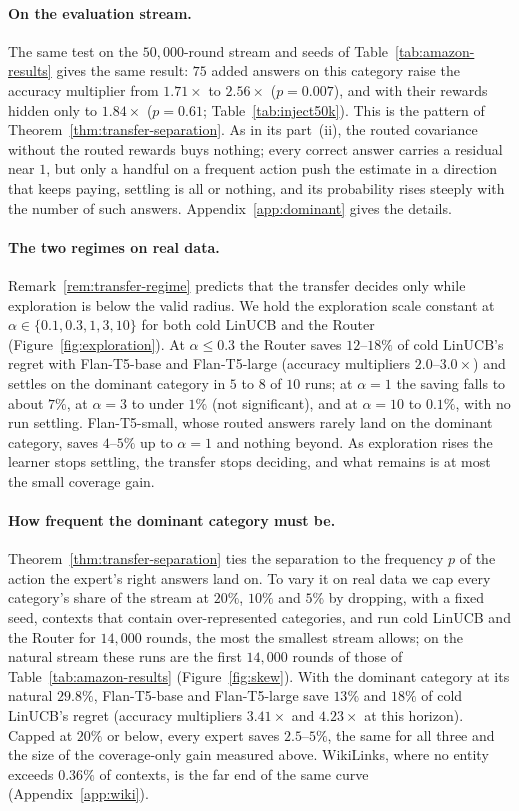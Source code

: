 \documentclass[anon]{alt2027} %
\begin{document}
\paragraph{On the evaluation stream.} The same test on the $50{,}000$-round
stream and seeds of Table~\ref{tab:amazon-results} gives the same result:
$75$ added answers on this category raise the accuracy multiplier from $1.71\times$ to
$2.56\times$ ($p=0.007$), and with their rewards hidden only to $1.84\times$
($p=0.61$; Table~\ref{tab:inject50k}). This is the pattern of
Theorem~\ref{thm:transfer-separation}. As in its part~(ii), the routed
covariance without the routed rewards buys nothing; every correct answer
carries a residual near $1$, but only a handful on a frequent action push the
estimate in a direction that keeps paying, settling is all or nothing, and
its probability rises steeply with the number of such answers.
Appendix~\ref{app:dominant} gives the details.

\paragraph{The two regimes on real data.} Remark~\ref{rem:transfer-regime}
predicts that the transfer decides only while exploration is below the valid
radius. We hold the exploration scale constant at
$\alpha\in\{0.1,0.3,1,3,10\}$ for both cold LinUCB and the Router
(Figure~\ref{fig:exploration}). At $\alpha\le0.3$ the Router saves $12$--$18\%$
of cold LinUCB's regret with Flan-T5-base and Flan-T5-large (accuracy
multipliers $2.0$--$3.0\times$) and settles on the dominant category in $5$ to
$8$ of $10$ runs; at $\alpha=1$ the saving falls to about $7\%$, at $\alpha=3$
to under $1\%$ (not significant), and at $\alpha=10$ to $0.1\%$, with no run
settling. Flan-T5-small, whose routed answers rarely land on the dominant
category, saves $4$--$5\%$ up to $\alpha=1$ and nothing beyond. As
exploration rises the learner stops settling, the transfer stops deciding,
and what remains is at most the small coverage gain.

\paragraph{How frequent the dominant category must be.}
Theorem~\ref{thm:transfer-separation} ties the separation to the frequency
$p$ of the action the expert's right answers land on. To vary it on real
data we cap every category's share of the stream at $20\%$, $10\%$ and $5\%$
by dropping, with a fixed seed, contexts that contain over-represented
categories, and run cold LinUCB and the Router for $14{,}000$ rounds, the most
the smallest stream allows; on the natural stream these runs are the first
$14{,}000$ rounds of those of Table~\ref{tab:amazon-results}
(Figure~\ref{fig:skew}). With the dominant category at its natural $29.8\%$,
Flan-T5-base and Flan-T5-large save $13\%$ and $18\%$ of cold LinUCB's regret
(accuracy multipliers $3.41\times$ and $4.23\times$ at this horizon). Capped at
$20\%$ or below, every expert saves $2.5$--$5\%$, the same for all three and
the size of the coverage-only gain measured above. WikiLinks, where no entity
exceeds $0.36\%$ of contexts, is the far end of the same curve
(Appendix~\ref{app:wiki}).
\end{document}
